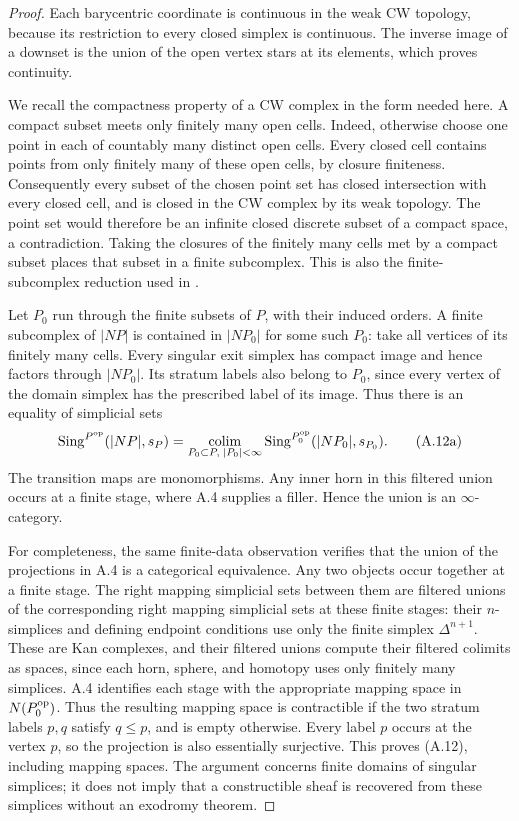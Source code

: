 \begin{proof}
Each barycentric coordinate is continuous in the weak CW topology,
because its restriction to every closed simplex is continuous. The
inverse image of a downset is the union of the open vertex stars at its
elements, which proves continuity.

We recall the compactness property of a CW complex in the form needed
here. A compact subset meets only finitely many open cells. Indeed,
otherwise choose one point in each of countably many distinct open
cells. Every closed cell contains points from only finitely many of
these open cells, by closure finiteness. Consequently every subset of
the chosen point set has closed intersection with every closed cell,
and is closed in the CW complex by its weak topology. The point set
would therefore be an infinite closed discrete subset of a compact
space, a contradiction. Taking the closures of the finitely many cells
met by a compact subset places that subset in a finite subcomplex.
This is also the finite-subcomplex reduction used in
\citet[Corollary A.6.9]{LurieHA}.

Let $P_0$ run through the finite subsets of $P$, with their induced
orders. A finite subcomplex of $|NP|$ is contained in $|NP_0|$ for some
such $P_0$: take all vertices of its finitely many cells. Every singular
exit simplex has compact image and hence factors through $|NP_0|$.
Its stratum labels also belong to $P_0$, since every vertex of the
domain simplex has the prescribed label of its image. Thus there is
an equality of simplicial sets
\[
 \operatorname{Sing}^{P^{\mathrm{op}}}(|NP|,s_P)
 =\operatorname*{colim}_{P_0\subset P,\;|P_0|<\infty}
       \operatorname{Sing}^{P_0^{\mathrm{op}}}(|NP_0|,s_{P_0}).
\tag{A.12a}
\]
The transition maps are monomorphisms. Any inner horn in this filtered
union occurs at a finite stage, where A.4 supplies a filler. Hence the
union is an $\infty$-category.

For completeness, the same finite-data observation verifies that the
union of the projections in A.4 is a categorical equivalence. Any two
objects occur together at a finite stage. The right mapping simplicial
sets between them are filtered unions of the corresponding right
mapping simplicial sets at these finite stages: their $n$-simplices
and defining endpoint conditions use only the finite simplex
$\Delta^{n+1}$. These are Kan complexes, and their filtered unions
compute their filtered colimits as spaces, since each horn, sphere,
and homotopy uses only finitely many simplices. A.4 identifies each
stage with the appropriate mapping space in $N(P_0^{\mathrm{op}})$. Thus the
resulting mapping space is contractible if the two stratum labels
$p,q$ satisfy $q\leq p$, and is empty otherwise. Every label $p$ occurs
at the vertex $p$, so the projection is also essentially surjective.
This proves (A.12), including mapping spaces. The argument concerns
finite domains of singular simplices; it does not imply that a
constructible sheaf is recovered from these simplices without an
exodromy theorem.
\end{proof}
